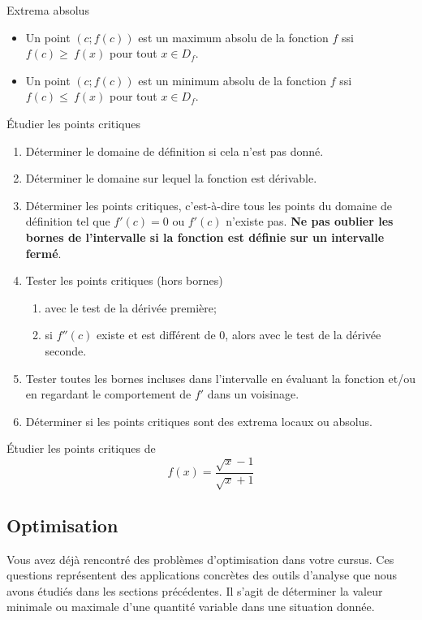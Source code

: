 \documentclass[a4paper,12pt]{article}
\begin{document}
\begin{definition}
	Extrema absolus
\tcblower
\begin{itemize}
	\item 	Un point $(c;f(c))$ est un maximum absolu de la fonction $f$ ssi $f(c)\geq~f(x)$ pour tout $x\in D_f$. 
\item Un point $(c;f(c))$ est un minimum absolu de la fonction $f$ ssi $f(c)\leq~f(x)$ pour tout $x\in D_f$. 
\end{itemize}
\end{definition}
\begin{methode}[label=met:ptcrit]
	Étudier les points critiques
	\tcblower
	\begin{enumerate}
		\item Déterminer le domaine de définition si cela n'est pas donné.
		\item Déterminer le domaine sur lequel la fonction est dérivable. 
		\item Déterminer les points critiques, c'est-à-dire tous les points du domaine de définition tel que $f'(c)=0$ ou $f'(c)$ n'existe pas. {\bfseries Ne pas oublier les bornes de l'intervalle si la fonction est définie sur un intervalle fermé}. 
		\item Tester les points critiques (hors bornes) 
			\begin{enumerate}
				\item avec le test de la dérivée première;
				\item si $f''(c)$ existe et est différent de $0$, alors avec le test de la dérivée seconde.
			\end{enumerate}
		\item Tester toutes les bornes incluses dans l'intervalle en évaluant la fonction et/ou en regardant le comportement de $f'$ dans un voisinage.
		\item Déterminer si les points critiques sont des extrema locaux ou absolus.
	\end{enumerate}
\end{methode}
\begin{activite}
	\tcblower
	Étudier les points critiques de 
	\[f(x)=\dfrac{\sqrt{x}-1}{\sqrt{x}+1}\]
\end{activite}

\subsection{Optimisation}
Vous avez déjà rencontré des problèmes d'optimisation dans votre cursus. Ces questions représentent des applications concrètes des outils d'analyse que nous avons étudiés dans les sections précédentes. Il s'agit de déterminer la valeur minimale ou maximale d'une quantité variable dans une situation donnée. 
\end{document}
